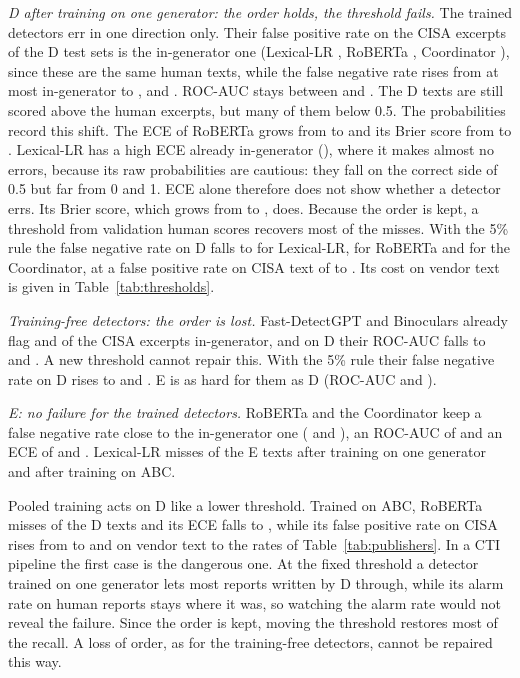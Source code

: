 \documentclass[journal]{IEEEtran}
\begin{document}
\emph{D after training on one generator: the order holds, the threshold fails.} The trained detectors err in one
direction only. Their false positive rate on the CISA excerpts of the D test sets is the in-generator one
(Lexical-LR \NgDLexlrFpr{}, RoBERTa \NgDTransFpr{}, Coordinator \NgDCoordFpr{}), since these are the same human
texts, while the false negative rate rises from at most \NgInLexlrFnr{} in-generator to \NgDLexlrFnr{},
\NgDTransFnr{} and \NgDCoordFnr{}. ROC-AUC stays between \NgDLexlrRocAuc{} and \NgDCoordRocAuc{}. The D texts are
still scored above the human excerpts, but many of them below 0.5. The probabilities record this shift. The ECE of
RoBERTa grows from \NgInTransEce{} to \NgDTransEce{} and its Brier score from \NgInTransBrier{} to
\NgDTransBrier{}. Lexical-LR has a high ECE already in-generator (\NgInLexlrEce{}), where it makes almost no errors,
because its raw probabilities are cautious: they fall on the correct side of 0.5 but far from 0 and 1. ECE alone
therefore does not show whether a detector errs. Its Brier score, which grows from \NgInLexlrBrier{} to
\NgDLexlrBrier{}, does. Because the order is kept, a threshold from validation human scores recovers most of the
misses. With the 5\% rule the false negative rate on D falls to \NgDLexlrFnrFive{} for Lexical-LR,
\NgDTransFnrFive{} for RoBERTa and \NgDCoordFnrFive{} for the Coordinator, at a false positive rate on CISA text of
\NgDLexlrFprFive{} to \NgDTransFprFive{}. Its cost on vendor text is given in Table~\ref{tab:thresholds}.

\emph{Training-free detectors: the order is lost.} Fast-DetectGPT and Binoculars already flag \NgInFastFpr{} and
\NgInBinoFpr{} of the CISA excerpts in-generator, and on D their ROC-AUC falls to \NgDFastRocAuc{} and
\NgDBinoRocAuc{}. A new threshold cannot repair this. With the 5\% rule their false negative rate on D rises to
\NgDFastFnrFive{} and \NgDBinoFnrFive{}. E is as hard for them as D (ROC-AUC \NgEFastRocAuc{} and \NgEBinoRocAuc{}).

\emph{E: no failure for the trained detectors.} RoBERTa and the Coordinator keep a false negative rate close to the
in-generator one (\NgETransFnr{} and \NgECoordFnr{}), an ROC-AUC of \NgETransRocAuc{} and an ECE of \NgETransEce{}
and \NgECoordEce{}. Lexical-LR misses \NgELexlrFnr{} of the E texts after training on one generator and
\NgEAbcLexlrFnr{} after training on ABC.

Pooled training acts on D like a lower threshold. Trained on ABC, RoBERTa misses \NgDAbcTransFnr{} of the D texts
and its ECE falls to \NgDAbcTransEce{}, while its false positive rate on CISA rises from \NgDTransFpr{} to
\NgDAbcTransFpr{} and on vendor text to the rates of Table~\ref{tab:publishers}. In a CTI pipeline the first case is
the dangerous one. At the fixed threshold a detector trained on one generator lets most reports written by D
through, while its alarm rate on human reports stays where it was, so watching the alarm rate would not reveal the
failure. Since the order is kept, moving the threshold restores most of the recall. A loss of order, as for the
training-free detectors, cannot be repaired this way.
\end{document}
